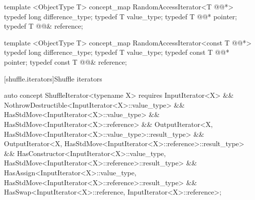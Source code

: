 \documentclass[american,twoside]{book}
\begin{document}
\color{addclr}
\begin{codeblock}
  template <ObjectType T> concept_map RandomAccessIterator<T @@*> {
    typedef long difference_type;
    typedef T value_type;
    typedef T @@* pointer;
    typedef T @@& reference;
  }

  template <ObjectType T> concept_map RandomAccessIterator<const T @@*> {
    typedef long difference_type;
    typedef T value_type;
    typedef const T @@* pointer;
    typedef const T @@& reference;
  }
\end{codeblock}
\textcolor{addclr}{\exitnote}
\color{black}

[shuffle.iterators]{Shuffle iterators}
\pnum
{}

\color{ccadd}
\begin{codeblock}
auto concept ShuffleIterator<typename X> {
  requires InputIterator<X>
        && NothrowDestructible<InputIterator<X>::value_type>
        && HasStdMove<InputIterator<X>::value_type>
        && HasStdMove<InputIterator<X>::reference>
        && OutputIterator<X, HasStdMove<InputIterator<X>::value_type>::result_type>
        && OutputIterator<X, HasStdMove<InputIterator<X>::reference>::result_type>
        && HasConstructor<InputIterator<X>::value_type, 
                          HasStdMove<InputIterator<X>::reference>::result_type>
        && HasAssign<InputIterator<X>::value_type, 
                     HasStdMove<InputIterator<X>::reference>::result_type>
        && HasSwap<InputIterator<X>::reference, InputIterator<X>::reference>;
}
\end{codeblock}
\color{black}

\pnum
{}

\pnum
{}
\end{document}
